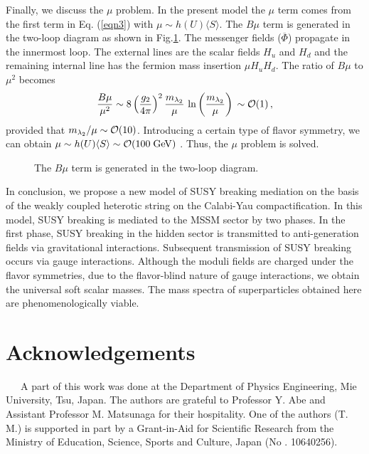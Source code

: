 Finally, we discuss the $\mu$ problem. 
In the present model the $\mu$ term comes from the first term in 
Eq. (\ref{eqn3}) with $\mu \sim h(U)\langle S \rangle $. 
The $B \mu $ term is generated in the two-loop diagram as shown in
Fig.\ref{fig1}. 
The messenger fields (${\overline \Phi}$) 
propagate in the innermost loop. 
The external lines are the scalar fields $H_{u}$ and $H_{d}$ and 
the remaining internal line has the fermion mass insertion 
$\mu H_{u}H_{d}$. 
The ratio of $B\mu$ to $\mu ^2$ becomes 
\begin{equation}
   \frac{B\mu}{\mu ^2} \sim 8 \left(\frac{g_{2}}{4\pi}\right)^{2}
                            \frac{m_{\lambda_{2}}}{\mu}\,
                      \ln\left(\frac{m_{\lambda_{2}}}{\mu}\right)\,
                    \sim {\cal O}(1)\,,
\label{eqn20}
\end{equation}
provided that $m_{\lambda_{2}}/\mu \sim {\cal O}(10)$. 
Introducing a certain type of flavor symmetry, 
we can obtain $\mu \sim h(U)\langle S \rangle\sim {\cal O}(100\;{\rm GeV})$
\cite{E6}. 
Thus, the $\mu$ problem is solved. 

\begin{figure}
      \epsfxsize=10cm
\centerline{}
\caption{The $B\mu$ term is generated in the two-loop diagram.}
\label{fig1}
\end{figure}

In conclusion, we propose a new model of SUSY breaking mediation 
on the basis of the weakly coupled heterotic string on the Calabi-Yau 
compactification. 
In this model, SUSY breaking is mediated to the MSSM sector by 
two phases. 
In the first phase, SUSY breaking in the hidden sector is 
transmitted to anti-generation fields via gravitational 
interactions. 
Subsequent transmission of SUSY breaking occurs via 
gauge interactions. 
Although the moduli fields are charged under the flavor symmetries, 
due to the flavor-blind nature of gauge interactions, we obtain the
universal soft scalar masses.
The mass spectra of superparticles obtained here are
phenomenologically viable.


\section*{Acknowledgements}
\ \ \ A part of this work was done at the Department of Physics 
Engineering, Mie University, Tsu, Japan. 
The authors are grateful to Professor Y. Abe and Assistant Professor
M. Matsunaga for their hospitality. 
One of the authors (T. M.) is supported in part by 
a Grant-in-Aid for Scientific Research from the Ministry 
of Education, Science, Sports and Culture, Japan 
(No . 10640256). 

